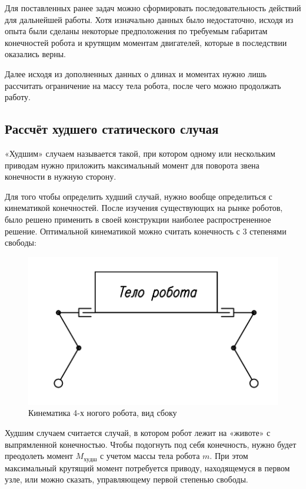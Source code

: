Для поставленных ранее задач можно сформировать последовательность действий для дальнейшей работы. Хотя изначально данных было недостаточно, исходя из опыта были сделаны некоторые предположения по требуемым габаритам конечностей робота и крутящим моментам двигателей, которые в последствии оказались верны.

Далее исходя из дополненных данных о длинах и моментах нужно лишь рассчитать ограничение на массу тела робота, после чего можно продолжать работу.

\subsection{Рассчёт худшего статического случая}

«Худшим» случаем называется такой, при котором одному или нескольким приводам нужно приложить максимальный момент для поворота звена конечности в нужную сторону.

Для того чтобы определить худший случай, нужно вообще определиться с кинематикой конечностей. После изучения существующих на рынке роботов, было решено применить в своей конструкции наиболее распрострененное решение. Оптимальной кинематикой можно считать конечность с 3 степенями свободы:

\begin{figure}[ht]
    \centering
    \includegraphics[scale=0.7]{kin1.png}
    \caption{Кинематика 4-х ногого робота, вид сбоку}
\end{figure}

Худшим случаем считается случай, в котором робот лежит на «животе» с выпрямленной конечностью. Чтобы подогнуть под себя конечность, нужно будет преодолеть момент $M_{худш}$ с учетом массы тела робота $m$. При этом максимальный крутящий момент потребуется приводу, находящемуся в первом узле, или можно сказать, управляющему первой степенью свободы.

